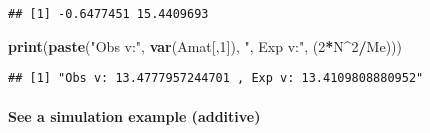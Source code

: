 \documentclass[]{article}
\newenvironment{Shaded}{\begin{snugshade}}{\end{snugshade}}
\newcommand{\DecValTok}[1]{\textcolor[rgb]{0.00,0.00,0.81}{#1}}
\newcommand{\KeywordTok}[1]{\textcolor[rgb]{0.13,0.29,0.53}{\textbf{#1}}}
\newcommand{\NormalTok}[1]{#1}
\newcommand{\OperatorTok}[1]{\textcolor[rgb]{0.81,0.36,0.00}{\textbf{#1}}}
\newcommand{\StringTok}[1]{\textcolor[rgb]{0.31,0.60,0.02}{#1}}
\let\oldparagraph\paragraph
\renewcommand{\paragraph}[1]{\oldparagraph{#1}\mbox{}}
\begin{document}
\begin{verbatim}
## [1] -0.6477451 15.4409693
\end{verbatim}

\begin{Shaded}
\begin{Highlighting}[]
\KeywordTok{print}\NormalTok{(}\KeywordTok{paste}\NormalTok{(}\StringTok{"Obs v:"}\NormalTok{, }\KeywordTok{var}\NormalTok{(Amat[,}\DecValTok{1}\NormalTok{]), }\StringTok{", Exp v:"}\NormalTok{, (}\DecValTok{2}\OperatorTok{*}\NormalTok{N}\OperatorTok{^}\DecValTok{2}\OperatorTok{/}\NormalTok{Me)))}
\end{Highlighting}
\end{Shaded}

\begin{verbatim}
## [1] "Obs v: 13.4777957244701 , Exp v: 13.4109808880952"
\end{verbatim}

\hypertarget{see-a-simulation-example-additive}{%
\paragraph{See a simulation example
(additive)}\label{see-a-simulation-example-additive}}
\end{document}
